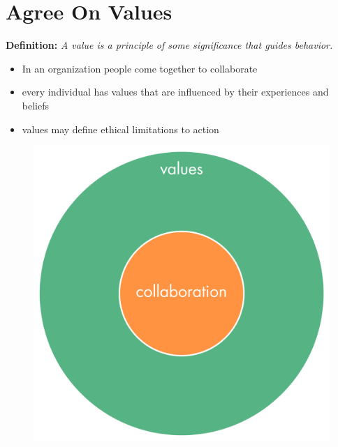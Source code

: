 \section{Agree On Values}
\label{agreeonvalues}

\textbf{Definition:} \emph{A value is a principle of some significance that guides behavior.}

\begin{itemize}
\item In an organization people come together to collaborate

\item every individual has values that are influenced by their experiences and beliefs

\item values may define ethical limitations to action

\end{itemize}

\begin{figure}[htbp]
\centering
\includegraphics[keepaspectratio,width=\textwidth,height=0.75\textheight]{img/collaboration-values/values-step2.png}
\end{figure}

